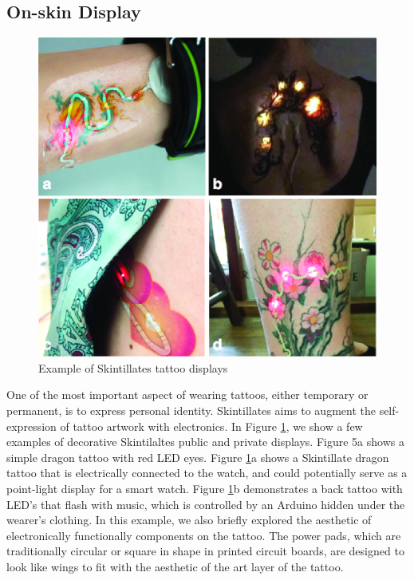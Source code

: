 \documentclass{sigchi}
\begin{document}
\subsection{On-skin Display}
\begin{figure}
\centering
\includegraphics[width=1\columnwidth]{figures/Figure5}
\caption{Example of Skintillates tattoo displays}
\vspace{-8pt}
\label{fig:displays}
\end{figure}
One of the most important aspect of wearing tattoos, either temporary or permanent, is to express personal identity. 
Skintillates aims to augment the self-expression of tattoo artwork with electronics. In Figure \ref{fig:displays}, we show a few examples of decorative Skintilaltes public and private displays. Figure 5a shows a simple dragon tattoo with red LED eyes. Figure \ref{fig:displays}a shows a Skintillate dragon tattoo that is electrically connected to the watch, and could potentially serve as a point-light display for a smart watch. Figure \ref{fig:displays}b demonstrates a back tattoo with LED’s that flash with music, which is controlled by an Arduino hidden under the wearer’s clothing. In this example, we also briefly explored the aesthetic of electronically functionally components on the tattoo. The power pads, which are traditionally circular or square in shape in printed circuit boards, are designed to look like wings to fit with the aesthetic of the art layer of the tattoo. 
\end{document}
